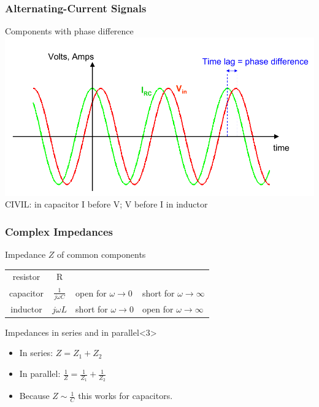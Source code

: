\documentclass[beamer]{standalone}
\begin{document}
\begin{frame}
 \frametitle{Alternating-Current Signals}
 \begin{block}{Components with phase difference}
  \includegraphics[width=\textwidth]{pics/Phase_difference} \\
  CIVIL: in capacitor I before V; V before I in inductor
 \end{block}
\end{frame}


\begin{frame}[t]
 \frametitle{Complex Impedances}
 \begin{block}{Impedance $Z$ of common components}
  \begin{center}
   \begin{tabular}{c|c|l|l}
    resistor & R & \\
    capacitor & $\frac{1}{j\omega C}$ & open for $\omega \to 0$ & short for $\omega \to \infty$ \\
    inductor & $j\omega L$ & short for $\omega \to 0$ & open for $\omega \to \infty$ \\
   \end{tabular}
  \end{center}
 \end{block}
 \begin{block}{Impedances in series and in parallel}<3>
  \begin{itemize}
   \item In series: $Z = Z_1 + Z_2$
   \item In parallel: $\frac{1}{Z} = \frac{1}{Z_1} + \frac{1}{Z_2}$
   \item Because $Z \sim \frac{1}{C}$ this works for capacitors.
  \end{itemize}
 \end{block}
\end{frame}
\end{document}
